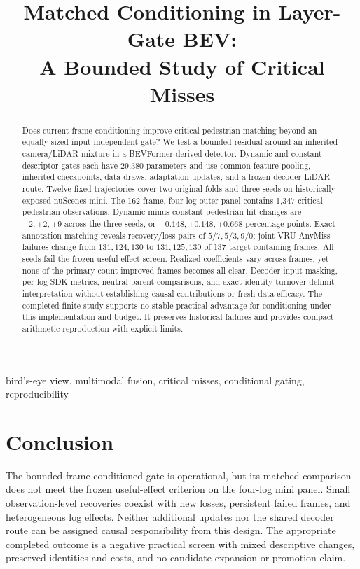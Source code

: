 \documentclass[conference]{IEEEtran}
\title{Matched Conditioning in Layer-Gate BEV:\\A Bounded Study of Critical Misses}
\author{\IEEEauthorblockN{Xiaotong Wu}\IEEEauthorblockA{Illinois Risk Lab (IRisk Lab)\\University of Illinois Urbana-Champaign\\xiaotongwu116@gmail.com\\\textit{Research Advisor: Dr. Zhiyu Quan}}}
\begin{document}
\maketitle
\begin{abstract}
Does current-frame conditioning improve critical pedestrian matching beyond an equally sized input-independent gate? We test a bounded residual around an inherited camera/LiDAR mixture in a BEVFormer-derived detector. Dynamic and constant-descriptor gates each have 29,380 parameters and use common feature pooling, inherited checkpoints, data draws, adaptation updates, and a frozen decoder LiDAR route. Twelve fixed trajectories cover two original folds and three seeds on historically exposed nuScenes mini. The 162-frame, four-log outer panel contains 1,347 critical pedestrian observations. Dynamic-minus-constant pedestrian hit changes are $-2,+2,+9$ across the three seeds, or $-0.148,+0.148,+0.668$ percentage points. Exact annotation matching reveals recovery/loss pairs of $5/7,5/3,9/0$; joint-VRU AnyMiss failures change from $131,124,130$ to $131,125,130$ of 137 target-containing frames. All seeds fail the frozen useful-effect screen. Realized coefficients vary across frames, yet none of the primary count-improved frames becomes all-clear. Decoder-input masking, per-log SDK metrics, neutral-parent comparisons, and exact identity turnover delimit interpretation without establishing causal contributions or fresh-data efficacy. The completed finite study supports no stable practical advantage for conditioning under this implementation and budget. It preserves historical failures and provides compact arithmetic reproduction with explicit limits.
\end{abstract}
\begin{IEEEkeywords}bird's-eye view, multimodal fusion, critical misses, conditional gating, reproducibility\end{IEEEkeywords}





\section{Conclusion}
The bounded frame-conditioned gate is operational, but its matched comparison does not meet the frozen useful-effect criterion on the four-log mini panel. Small observation-level recoveries coexist with new losses, persistent failed frames, and heterogeneous log effects. Neither additional updates nor the shared decoder route can be assigned causal responsibility from this design. The appropriate completed outcome is a negative practical screen with mixed descriptive changes, preserved identities and costs, and no candidate expansion or promotion claim.


\end{document}
